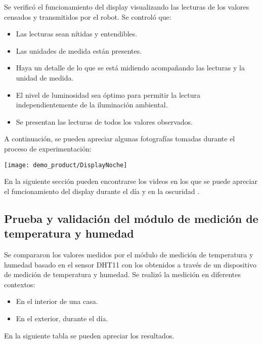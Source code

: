 Se verificó el funcionamiento del display visualizando las lecturas de los valores censados y transmitidos por el robot. Se controló que:

\begin{itemize}
	\item Las lecturas sean nítidas y entendibles.
	\item Las unidades de medida están presentes.
	\item Haya un detalle de lo que se está midiendo acompañando las lecturas y la unidad de medida.
	\item El nivel de luminosidad sea óptimo para permitir la lectura independientemente de la iluminación ambiental.
	\item Se presentan las lecturas de todos los valores observados.
\end{itemize}


A continuación, se pueden apreciar algunas fotografías tomadas durante el proceso de experimentación:

\begin{center}
\texttt{[image: demo\_product/DisplayNoche]}
  \label{fig:DisplayNoche}
\end{center}


En la siguiente sección pueden encontrarse los videos en los que se puede apreciar el funcionamiento del display durante el día \cite{Demo_Mediciones} y en la oscuridad \cite{Demo_Display_Oscuridad}.

\subsection{Prueba y validación del módulo de medición de temperatura y humedad}

Se compararon los valores medidos por el módulo de medición de temperatura y humedad basado en el sensor DHT11 con los obtenidos a través de un dispositivo de medición de temperatura y humedad. Se realizó la medición en diferentes contextos:

\begin{itemize}
	\item En el interior de una casa.
	\item En el exterior, durante el día.
\end{itemize}

En la siguiente tabla se pueden apreciar los resultados.

